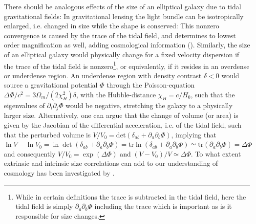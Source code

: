 \documentclass[a4paper,fleqn,usenatbib]{mnras}
\begin{document}
There should be analogous effects of the size of an elliptical galaxy due to tidal gravitational fields: In gravitational lensing the light bundle can be isotropically enlarged, i.e. changed in size while the shape is conserved: This nonzero convergence is caused by the trace of the tidal field, and determines to lowest order magnification as well, adding cosmological information (\cite{Huff:2011cq, takahashi_probability_2011}). Similarly, the size of an elliptical galaxy would physically change for a fixed velocity dispersion if the trace of the tidal field is nonzero\footnote{While in certain definitions the trace is subtracted in the tidal field, here the tidal field is simply $\partial_a\partial_b\Phi$ including the trace which is important as is it responsible for size changes.}, or equivalently, if it resides in an overdense or underdense region. An underdense region with density contrast $\delta < 0$ would source a gravitational potential $\Phi$ through the Poisson-equation $\Delta\Phi/c^2 = 3\Omega_m/(2\chi_H^2)\delta$, with the Hubble-distance $\chi_H = c/H_0$, such that the eigenvalues of $\partial_i\partial_j\Phi$ would be negative, stretching the galaxy to a physically larger size. Alternatively, one can argue that the change of volume (or area) is given by the Jacobian of the differential acceleration, i.e. of the tidal field, such that the perturbed volume is $V/V_0 = \mathrm{det}(\delta_{ab} + \partial_a\partial_b\Phi)$, implying that $\ln V-\ln V_0 = \ln\det(\delta_{ab} + \partial_a\partial_b\Phi) = \mathrm{tr}\ln(\delta_{ab} + \partial_a\partial_b\Phi) \simeq \mathrm{tr}(\partial_a\partial_b\Phi) = \Delta\Phi$ and consequently $V/V_0 = \exp(\Delta\Phi)$ and $(V-V_0)/V \simeq\Delta\Phi$. To what extent extrinsic and intrinsic size correlations can add to our understanding of cosmology has been investigated by \citet{heavens_combining_2013}.
\end{document}
